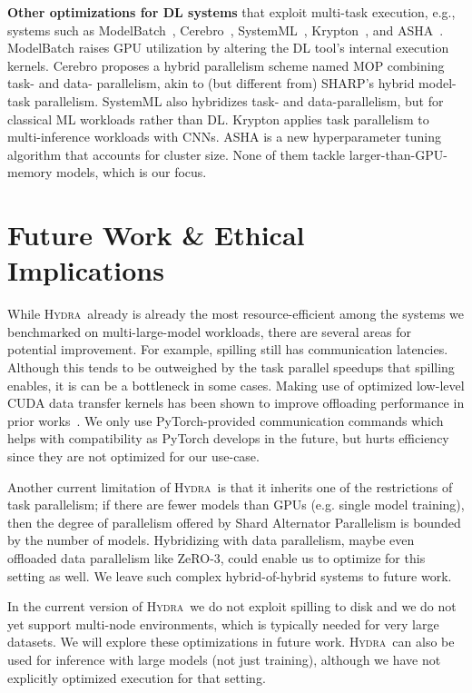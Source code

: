 \documentclass{article}
\newcommand{\system}{\textsc{Hydra}}
\begin{document}
{{\textbf{Other optimizations for DL systems} that exploit multi-task execution, e.g., systems such as ModelBatch~\cite{modelbatch}, Cerebro~\cite{cerebro:kumar}, SystemML~\cite{systemml}, Krypton~\cite{krypton}, and ASHA~\cite{asha}. ModelBatch raises GPU utilization by altering the DL tool's internal execution kernels. Cerebro proposes a hybrid parallelism scheme named MOP combining task- and data- parallelism, akin to (but different from) SHARP's hybrid model-task parallelism. SystemML also hybridizes task- and data-parallelism, but for classical ML workloads rather than DL. Krypton applies task parallelism to multi-inference workloads with CNNs. ASHA is a new hyperparameter tuning algorithm that accounts for cluster size. None of them tackle larger-than-GPU-memory models, which is our focus. 

\section{Future Work \& Ethical Implications}
\label{sec:improvements}
While \system~already is already the most resource-efficient among the systems we benchmarked on multi-large-model workloads, there are several areas for potential improvement. For example, spilling still has communication latencies. Although this tends to be outweighed by the task parallel speedups that spilling enables, it is can be a bottleneck in some cases. Making use of optimized low-level CUDA data transfer kernels has been shown to improve offloading performance in prior works~\cite{zeroDeep,l2l}. We only use PyTorch-provided communication commands which helps with compatibility as PyTorch develops in the future, but hurts efficiency since they are not optimized for our use-case. 

Another current limitation of \system~is that it inherits one of the restrictions of task parallelism; if there are fewer models than GPUs (e.g. single model training), then the degree of parallelism offered by Shard Alternator Parallelism is bounded by the number of models. Hybridizing with data parallelism, maybe even offloaded data parallelism like ZeRO-3, could enable us to optimize for this setting as well. We leave such complex hybrid-of-hybrid systems to future work.

In the current version of \system~we do not exploit spilling to disk and we do not yet support multi-node environments, which is typically needed for very large datasets. We will explore these optimizations in future work. \system~can also be used for inference with large models (not just training), although we have not explicitly optimized execution for that setting.

}}
\end{document}
